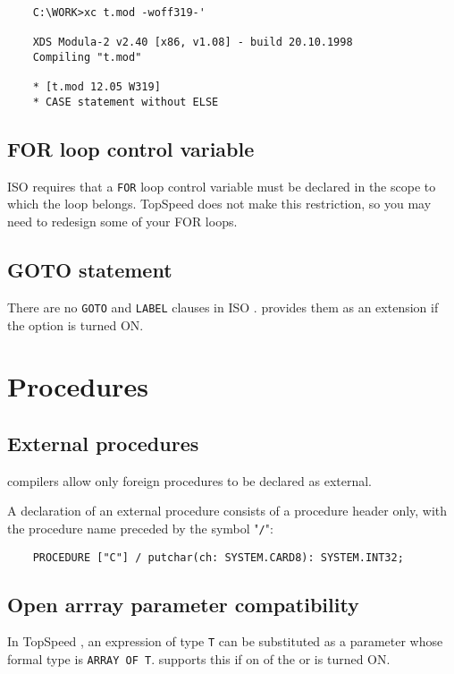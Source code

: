 \begin{verbatim}
    C:\WORK>xc t.mod -woff319-'

    XDS Modula-2 v2.40 [x86, v1.08] - build 20.10.1998
    Compiling "t.mod"

    * [t.mod 12.05 W319]
    * CASE statement without ELSE
\end{verbatim}

\subsection{FOR loop control variable}

    ISO \mt{} requires that a \verb'FOR' loop control variable must be declared
    in the scope to which the loop belongs. TopSpeed does not make this
    restriction, so you may need to redesign some of your FOR loops.

\subsection{GOTO statement}

    There are no \verb'GOTO' and \verb'LABEL' clauses in ISO \mt{}. \XDS{}
    provides them as an extension if the option  is turned ON.

\section{Procedures}

\subsection{External procedures}

     \xds{} compilers allow only foreign procedures to be declared as 
     external.

     A declaration of an external procedure consists of a procedure header 
     only, with the procedure name preceded by the symbol "\verb'/'":

     \verb'    PROCEDURE ["C"] / putchar(ch: SYSTEM.CARD8): SYSTEM.INT32;'

\subsection{Open arrray parameter compatibility}

    In TopSpeed \mt{}, an expression of type \verb'T' can be substituted as 
    a parameter whose formal type is \verb'ARRAY OF T'. \xds{} supports 
    this if on of the  or  is turned ON.

